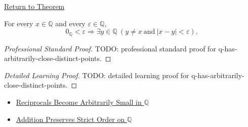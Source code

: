 \newpage
{}
\label{prf:q-has-arbitrarily-close-distinct-points}

\begin{remark*}[Return]
\hyperref[thm:q-has-arbitrarily-close-distinct-points]{Return to Theorem}
\end{remark*}

\begin{theorem*}
For every $x\in\mathbb{Q}$ and every $\varepsilon\in\mathbb{Q}$,
\[
0_{\mathbb{Q}}<\varepsilon
\Longrightarrow
\exists y\in\mathbb{Q}\ (y\ne x\ \text{and}\ |x-y|<\varepsilon).
\]
\end{theorem*}

\begin{proof}[Professional Standard Proof]
\LRAProofBodyStart
TODO: professional standard proof for q-has-arbitrarily-close-distinct-points.
\end{proof}

\begin{proof}[Detailed Learning Proof]
\LRAProofBodyStart
TODO: detailed learning proof for q-has-arbitrarily-close-distinct-points.
\end{proof}

\begin{remark*}
\end{remark*}

\begin{dependencies}
\begin{itemize}
  \item \hyperref[cor:reciprocals-arbitrarily-small-q]{Reciprocals Become Arbitrarily Small in $\mathbb{Q}$}
  \item \hyperref[thm:addition-preserves-strict-order-on-q]{Addition Preserves Strict Order on $\mathbb{Q}$}
\end{itemize}
\end{dependencies}

\clearpage
